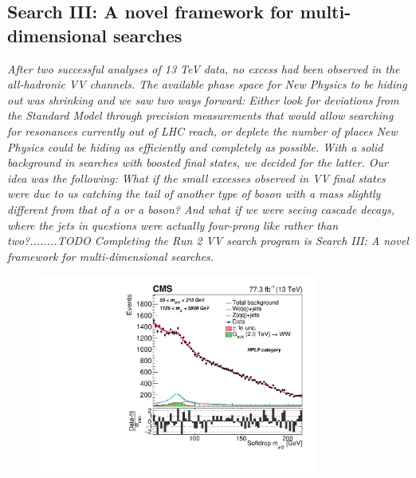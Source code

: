 \vspace*{\fill}

\clearpage

\clearpage

\vspace*{\fill}
\begin{centering}
\section{Search III: A novel framework for multi-dimensional searches}
\textit{
After two successful analyses of 13 TeV data, no excess had been observed in the all-hadronic VV channels. The available phase space for New Physics to be hiding out was shrinking and we saw two ways forward: Either look for deviations from the Standard Model through precision measurements that would allow searching for resonances currently out of LHC reach, or deplete the number of places New Physics could be hiding as efficiently and completely as possible.
With a solid background in searches with boosted final states, we decided for the latter. Our idea was the following: What if the small excesses observed in VV final states were due to us catching the tail of another type of boson with a mass slightly different from that of a \PW or a \PZ boson? And what if we were seeing cascade decays, where the jets in questions were actually four-prong like rather than two?........TODO
\newline
\newline
Completing the Run 2 VV search program is Search III: A novel framework for multi-dimensional searches.
}
\end{centering}
\begin{figure}[b!]
    \centering
    \includegraphics[height=6.5cm]{figures/analysis/search3/B2G-18-002/PostFitComboHPLP_Y-Proj__x___0_-1_z___0_-1.pdf}
\end{figure}

\vspace*{\fill}

\clearpage




